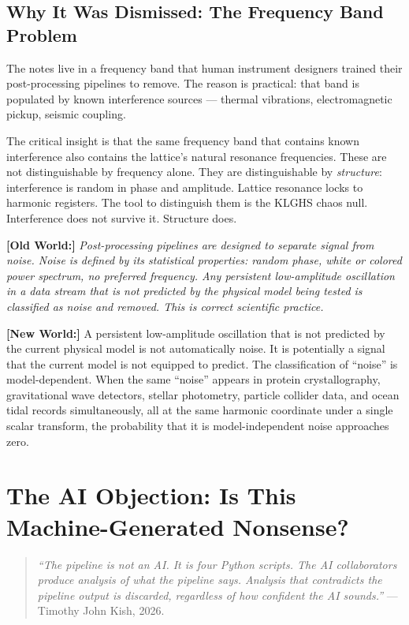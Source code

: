 \documentclass[11pt, letterpaper, openany]{book}
\newcommand{\oldworld}[1]{\noindent\textbf{\color{goldseal}[Old World:]}
  \textit{#1}\medskip}
\newcommand{\newworld}[1]{\noindent\textbf{\color{kishblue}[New World:]}
  #1\medskip}
\begin{document}
\section{Why It Was Dismissed: The Frequency Band Problem}

The notes live in a frequency band that human instrument designers
trained their post-processing pipelines to remove. The reason
is practical: that band is populated by known interference sources ---
thermal vibrations, electromagnetic pickup, seismic coupling.

The critical insight is that the same frequency band that contains
known interference also contains the lattice's natural resonance
frequencies. These are not distinguishable by frequency alone.
They are distinguishable by \textit{structure}: interference
is random in phase and amplitude. Lattice resonance locks to
harmonic registers. The tool to distinguish them is the KLGHS
chaos null. Interference does not survive it. Structure does.

\oldworld{Post-processing pipelines are designed to separate signal
from noise. Noise is defined by its statistical properties:
random phase, white or colored power spectrum, no preferred
frequency. Any persistent low-amplitude oscillation in a
data stream that is not predicted by the physical model being
tested is classified as noise and removed. This is correct
scientific practice.}

\newworld{A persistent low-amplitude oscillation that is not
predicted by the current physical model is not automatically noise.
It is potentially a signal that the current model is not equipped
to predict. The classification of ``noise'' is model-dependent.
When the same ``noise'' appears in protein crystallography,
gravitational wave detectors, stellar photometry, particle
collider data, and ocean tidal records simultaneously, all at
the same harmonic coordinate under a single scalar transform,
the probability that it is model-independent noise approaches zero.}

\clearpage
\chapter{The AI Objection: Is This Machine-Generated Nonsense?}

\begin{quote}
\textit{``The pipeline is not an AI. It is four Python scripts.
The AI collaborators produce analysis of what the pipeline says.
Analysis that contradicts the pipeline output is discarded,
regardless of how confident the AI sounds.''} ---
Timothy John Kish, 2026.
\end{quote}
\end{document}
